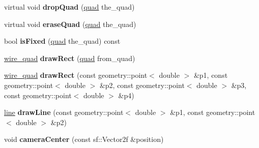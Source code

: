 \begin{DoxyCompactItemize}
\item 
\hypertarget{classophidian_1_1gui_1_1circuit__canvas_a749957ad3553972728d0f768ca38db41}{virtual void {\bfseries drop\-Quad} (\hyperlink{structophidian_1_1gui_1_1quad}{quad} the\-\_\-quad)}\label{classophidian_1_1gui_1_1circuit__canvas_a749957ad3553972728d0f768ca38db41}

\item 
\hypertarget{classophidian_1_1gui_1_1circuit__canvas_ac9b8f1efc89069000feab16fe605e4f4}{virtual void {\bfseries erase\-Quad} (\hyperlink{structophidian_1_1gui_1_1quad}{quad} the\-\_\-quad)}\label{classophidian_1_1gui_1_1circuit__canvas_ac9b8f1efc89069000feab16fe605e4f4}

\item 
\hypertarget{classophidian_1_1gui_1_1circuit__canvas_ac28234b9296aef98ef4a76da97168493}{bool {\bfseries is\-Fixed} (\hyperlink{structophidian_1_1gui_1_1quad}{quad} the\-\_\-quad) const }\label{classophidian_1_1gui_1_1circuit__canvas_ac28234b9296aef98ef4a76da97168493}

\item 
\hypertarget{classophidian_1_1gui_1_1circuit__canvas_a07c94b6f3c8cb629bf60807ad7b0d3de}{\hyperlink{structophidian_1_1gui_1_1wire__quad}{wire\-\_\-quad} {\bfseries draw\-Rect} (\hyperlink{structophidian_1_1gui_1_1quad}{quad} from\-\_\-quad)}\label{classophidian_1_1gui_1_1circuit__canvas_a07c94b6f3c8cb629bf60807ad7b0d3de}

\item 
\hypertarget{classophidian_1_1gui_1_1circuit__canvas_ab0875c89e8968b880d6d4f2a2ff8a4c1}{\hyperlink{structophidian_1_1gui_1_1wire__quad}{wire\-\_\-quad} {\bfseries draw\-Rect} (const geometry\-::point$<$ double $>$ \&p1, const geometry\-::point$<$ double $>$ \&p2, const geometry\-::point$<$ double $>$ \&p3, const geometry\-::point$<$ double $>$ \&p4)}\label{classophidian_1_1gui_1_1circuit__canvas_ab0875c89e8968b880d6d4f2a2ff8a4c1}

\item 
\hypertarget{classophidian_1_1gui_1_1circuit__canvas_a40b539a8c004ffb3d1683f725f08dae2}{\hyperlink{structophidian_1_1gui_1_1line}{line} {\bfseries draw\-Line} (const geometry\-::point$<$ double $>$ \&p1, const geometry\-::point$<$ double $>$ \&p2)}\label{classophidian_1_1gui_1_1circuit__canvas_a40b539a8c004ffb3d1683f725f08dae2}

\item 
\hypertarget{classophidian_1_1gui_1_1circuit__canvas_ab840a36be381dc0a9500f7a11ccdb181}{void {\bfseries camera\-Center} (const sf\-::\-Vector2f \&position)}\label{classophidian_1_1gui_1_1circuit__canvas_ab840a36be381dc0a9500f7a11ccdb181}


\end{DoxyCompactItemize}

